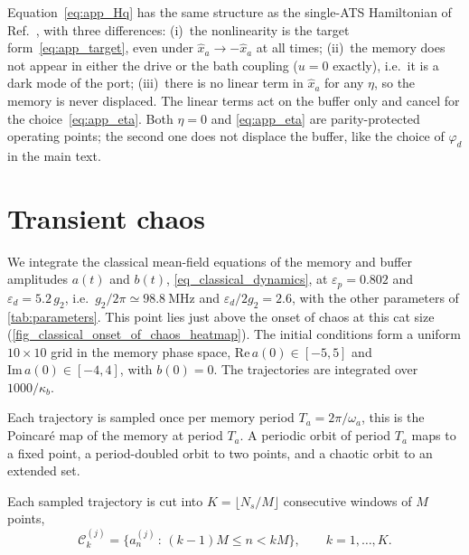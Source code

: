 \documentclass[aps,prx,reprint,floatfix,amsmath,amssymb,longbibliography]{revtex4-2}
\newcommand{\eps}{\varepsilon}
\begin{document}
Equation~\eqref{eq:app_Hq} has the same structure as the single-ATS
Hamiltonian of Ref.~\cite{Carde2025Feb}, with three differences:
(i)~the nonlinearity is the target form~\eqref{eq:app_target}, even under
$\hat{x}_a\to-\hat{x}_a$ at all times;
(ii)~the memory does not appear in either the drive or the bath coupling
($u=0$ exactly), i.e.\ it is a dark mode of the port;
(iii)~there is no linear term in $\hat{x}_a$ for any $\eta$, so the
memory is never displaced. The linear terms act on the buffer only and
cancel for the choice~\eqref{eq:app_eta}. Both $\eta=0$ and
\cref{eq:app_eta} are parity-protected operating points; the second one
does not displace the buffer, like the choice of $\varphi_d$ in the main
text.

\section{Transient chaos}
\label{sec:transient_chaos}


We integrate the classical mean-field equations of the memory and buffer amplitudes $a(t)$ and $b(t)$, \cref{eq_classical_dynamics}, at $\eps_p=0.802$ and $\eps_d=5.2\,g_2$, i.e.\ $g_2/2\pi\simeq98.8~\mathrm{MHz}$ and $\eps_d/2g_2=2.6$, with the other parameters of \cref{tab:parameters}. This point lies just above the onset of chaos at this cat size (\cref{fig_classical_onset_of_chaos_heatmap}). The initial conditions form a uniform $10\times10$ grid in the memory phase space, $\mathrm{Re}\,a(0)\in[-5,5]$ and $\mathrm{Im}\,a(0)\in[-4,4]$, with $b(0)=0$. The trajectories are integrated over $1000/\kappa_b$.

Each trajectory is sampled once per memory period $T_a = 2\pi/\omega_a$,
this is the Poincaré map of the memory at period $T_a$. A periodic orbit of period $T_a$ maps to a fixed point, a period-doubled orbit to two points, and a chaotic orbit to an extended set.

Each sampled trajectory is cut into $K = \lfloor N_s/M \rfloor$ consecutive windows of $M$ points,
\begin{equation}
    \mathcal{C}^{(j)}_k = \bigl\{ a^{(j)}_n \,:\, (k-1)M \le n < kM \bigr\}, \qquad k = 1,\dots,K .
\end{equation}
\end{document}
